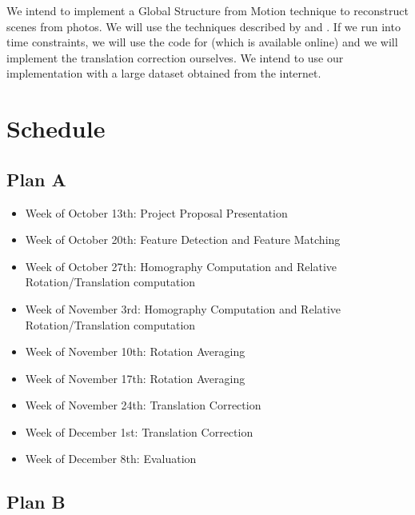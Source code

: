\documentclass[conference, 12pt]{acmsiggraph}
\begin{document}
We intend to implement a Global Structure from Motion technique to reconstruct scenes from photos. We will use the techniques described by \cite{rotation} and \cite{translation}. If we run into time constraints, we will use the code for \cite{rotation} (which is available online) and we will implement the translation correction ourselves. We intend to use our implementation with a large dataset obtained from the internet.

\section{Schedule}

\subsection{Plan A}

\begin{itemize}
	\item {Week of October 13th}: Project Proposal Presentation
	\item {Week of October 20th}: Feature Detection and Feature Matching
	\item {Week of October 27th}: Homography Computation and Relative Rotation/Translation computation
	\item {Week of November 3rd}: Homography Computation and Relative Rotation/Translation computation
	\item {Week of November 10th}: Rotation Averaging
	\item {Week of November 17th}: Rotation Averaging
	\item {Week of November 24th}: Translation Correction
	\item {Week of December 1st}: Translation Correction
	\item {Week of December 8th}: Evaluation
\end{itemize}

\subsection{Plan B}
\end{document}
